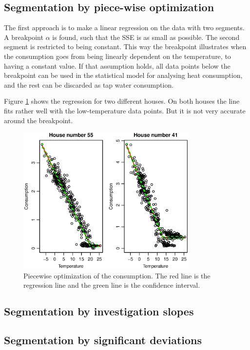 \subsection{Segmentation by piece-wise optimization}
The first approach is to make a linear regression on the data with two segments. A breakpoint $\alpha$ is found, such that the SSE is as small as possible. The second segment is restricted to being constant. This way the breakpoint
illustrates when the consumption goes from being linearly dependent on the temperature, to having a constant value. If that assumption holds, all data points below the breakpoint
can be used in the statistical model for analysing heat consumption, and the rest can be discarded as tap water consumption.

\noindent Figure \ref{fig: Consumption-PW} shows the regression for two different houses. On both houses the
line fits rather well with the low-temperature data points. But it is not very accurate around the breakpoint.
\begin{figure}
    \centering
    \includegraphics[width=0.8\textwidth]{../../../figures/Consumption-PW.eps}
    \caption{Piecewise optimization of the consumption. The red line is the regression line and the green line is the confidence interval.}
    \label{fig: Consumption-PW}
\end{figure}

\subsection{Segmentation by investigation slopes}

\subsection{Segmentation by significant deviations}


